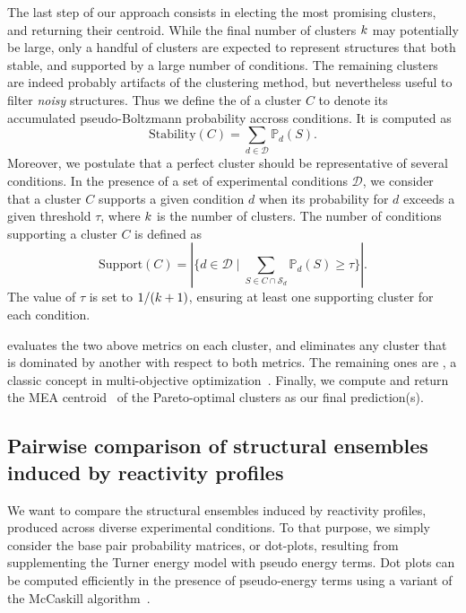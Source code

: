 \documentclass[a4,center,fleqn]{NAR}
\begin{document}
The last step of our approach consists in electing the most promising clusters, and returning their centroid. While the final number of clusters $k$ may potentially be large, only a handful of clusters are expected to represent structures that both stable, and supported by a large number of conditions. The remaining clusters are indeed probably artifacts of the clustering method, but nevertheless useful to filter \emph{noisy} structures. Thus we define the  of a cluster $C$ to denote its accumulated pseudo-Boltzmann probability accross conditions. It is computed as 
\[\text{Stability}(C) = \sum_{d\in \mathcal{D}} \mathbb{P}_d(S).\]
Moreover, we postulate that a perfect cluster should be representative of several conditions. In the presence of a set of experimental conditions $\mathcal{D}$, we consider that a cluster $C$ supports a given condition $d$ when its probability for $d$ exceeds a given threshold $\tau$, where $k$ is the number of clusters. The number of conditions supporting a cluster $C$ is defined as
\[\text{Support}(C) = |\{d\in \mathcal{D} \mid \sum_{S\in C\cap \mathcal{S}_d} \mathbb{P}_d(S)\ge \tau \}|.\]
The value of $\tau$ is set to $1/(k+1)$, ensuring at least one supporting cluster for each condition.

\OurTool evaluates the two above metrics on each cluster, and eliminates any cluster that is dominated by another with respect to both metrics. The remaining ones are , a classic concept in multi-objective optimization~\cite{Mattson2005}. Finally, we compute and return the MEA centroid~\citep{Lu2009} of the Pareto-optimal clusters as our final prediction(s).



\subsection*{Pairwise comparison of structural ensembles induced by reactivity profiles}\label{sec:dotplots}

We want to compare the structural ensembles induced by reactivity profiles, produced across diverse experimental conditions. To that purpose, we simply consider the base pair probability matrices, or dot-plots, resulting from supplementing the Turner energy model with pseudo energy terms. %
Dot plots can be computed efficiently in the presence of pseudo-energy terms using a variant of the McCaskill algorithm~\citep{McCaskill1990}.
\end{document}
